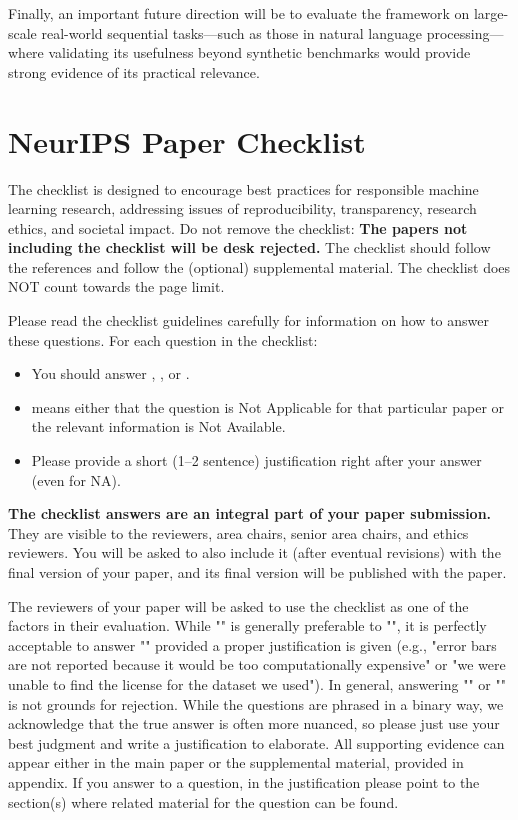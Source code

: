 \documentclass{article}
\begin{document}
Finally, an important future direction will be to evaluate the framework on large-scale real-world sequential tasks—such as those in natural language processing—where validating its usefulness beyond synthetic benchmarks would provide strong evidence of its practical relevance.





\newpage
\section*{NeurIPS Paper Checklist}

The checklist is designed to encourage best practices for responsible machine learning research, addressing issues of reproducibility, transparency, research ethics, and societal impact. Do not remove the checklist: {\bf The papers not including the checklist will be desk rejected.} The checklist should follow the references and follow the (optional) supplemental material.  The checklist does NOT count towards the page
limit. 

Please read the checklist guidelines carefully for information on how to answer these questions. For each question in the checklist:
\begin{itemize}
    \item You should answer \answerYes{}, \answerNo{}, or \answerNA{}.
    \item \answerNA{} means either that the question is Not Applicable for that particular paper or the relevant information is Not Available.
    \item Please provide a short (1–2 sentence) justification right after your answer (even for NA). 
\end{itemize}

{\bf The checklist answers are an integral part of your paper submission.} They are visible to the reviewers, area chairs, senior area chairs, and ethics reviewers. You will be asked to also include it (after eventual revisions) with the final version of your paper, and its final version will be published with the paper.

The reviewers of your paper will be asked to use the checklist as one of the factors in their evaluation. While "\answerYes{}" is generally preferable to "\answerNo{}", it is perfectly acceptable to answer "\answerNo{}" provided a proper justification is given (e.g., "error bars are not reported because it would be too computationally expensive" or "we were unable to find the license for the dataset we used"). In general, answering "\answerNo{}" or "\answerNA{}" is not grounds for rejection. While the questions are phrased in a binary way, we acknowledge that the true answer is often more nuanced, so please just use your best judgment and write a justification to elaborate. All supporting evidence can appear either in the main paper or the supplemental material, provided in appendix. If you answer \answerYes{} to a question, in the justification please point to the section(s) where related material for the question can be found.
\end{document}
